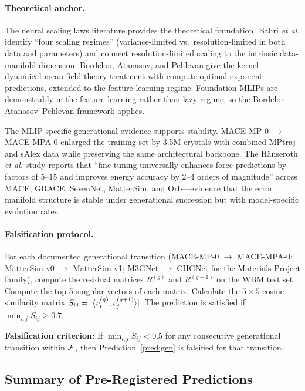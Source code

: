 \paragraph{Theoretical anchor.} The neural scaling laws literature provides the theoretical foundation. Bahri \emph{et al.}\cite{bahri2024explaining} identify ``four scaling regimes'' (variance-limited vs.\ resolution-limited in both data and parameters) and connect resolution-limited scaling to the intrinsic data-manifold dimension. Bordelon, Atanasov, and Pehlevan\cite{bordelon2024dynamical,bordelon2024feature} give the kernel-dynamical-mean-field-theory treatment with compute-optimal exponent predictions, extended to the feature-learning regime. Foundation MLIPs are demonstrably in the feature-learning rather than lazy regime\cite{park2024sevennet}, so the Bordelon--Atanasov--Pehlevan framework applies.

The MLIP-specific generational evidence supports stability. MACE-MP-0 $\to$ MACE-MPA-0 enlarged the training set by 3.5M crystals with combined MPtraj and sAlex data while preserving the same architectural backbone. The Hänseroth \emph{et al.}\cite{hanseroth2025finetuning} study reports that ``fine-tuning universally enhances force predictions by factors of 5--15 and improves energy accuracy by 2--4 orders of magnitude'' across MACE, GRACE, SevenNet, MatterSim, and Orb---evidence that the error manifold structure is stable under generational succession but with model-specific evolution rates.

\paragraph{Falsification protocol.} For each documented generational transition (MACE-MP-0 $\to$ MACE-MPA-0; MatterSim-v0 $\to$ MatterSim-v1; M3GNet $\to$ CHGNet for the Materials Project family), compute the residual matrices $R^{(g)}$ and $R^{(g+1)}$ on the WBM test set. Compute the top-5 singular vectors of each matrix. Calculate the $5 \times 5$ cosine-similarity matrix $S_{ij} = |\langle v_i^{(g)}, v_j^{(g+1)} \rangle|$. The prediction is satisfied if $\min_{i,j} S_{ij} \geq 0.7$.

\textbf{Falsification criterion:} If $\min_{i,j} S_{ij} < 0.5$ for any consecutive generational transition within $\mathcal{F}$, then Prediction~\ref{pred:gen} is falsified for that transition.

\subsection{Summary of Pre-Registered Predictions}

